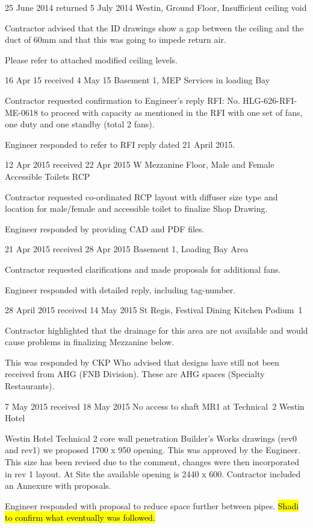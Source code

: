  {25 June 2014  returned 5 July 2014} {Westin, Ground Floor, Insufficient ceiling void}
{
   \item Contractor advised that the ID drawings show a gap between the ceiling and the duct of 60mm and that this was going to impede return air.
   \item Please refer to attached modified ceiling levels.
}

 {16 Apr 15 received 4 May 15 } {Basement 1, MEP Services in loading Bay}
{
  \item Contractor requested confirmation to Engineer's reply RFI: No. HLG-626-RFI-ME-0618 to proceed with capacity as mentioned in the RFI with one set of fans, one duty and one standby (total 2 fans). 
  \item Engineer responded to refer to RFI reply dated 21 April 2015.
}

 {12 Apr 2015 received 22 Apr 2015} {W Mezzanine Floor, Male and Female Accessible Toilets RCP}
  {
    \item Contractor requested co-ordinated RCP layout with diffuser size type and location for male/female and accessible toilet to finalize Shop Drawing.
   \item Engineer responded by providing CAD and PDF files. 
   
  }
  
  {21 Apr 2015 received 28 Apr 2015} {Basement 1, Loading Bay Area}
 {
   \item Contractor requested clarifications and made proposals for additional fans.
   \item Engineer responded with detailed reply, including tag-number. 
 }
 
 {28 April 2015 received 14 May 2015 } {St Regis, Festival Dining Kitchen Podium~1 }
 {
   \item Contractor highlighted that the drainage for this area are not available and would cause problems in finalizing Mezzanine below.
   \item This was responded by CKP Who advised that designs have still not been received from AHG (FNB Division). These are AHG spaces (Specialty Restaurants). \delay\delay\delay
 }


 {7 May 2015 received 18 May 2015} {No access to shaft MR1 at Technical~2 Westin Hotel}
{
  \item Westin Hotel Technical 2 core wall penetration Builder's Works drawings (rev0 and rev1) we proposed 1700 x 950   opening. This was approved by the Engineer. This size has been revised due to the comment, changes were then incorporated in rev 1 layout. At Site the available opening is 2440 x 600. Contractor included an Annexure with proposals.
  \item Engineer responded with proposal to reduce space further between pipes. \hl{Shadi to confirm what eventually was followed.}
}

